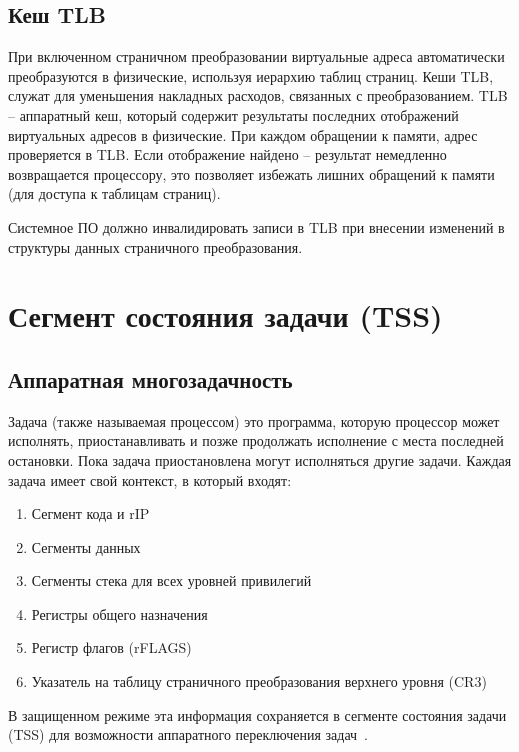 \subsection{Кеш TLB}
При включенном страничном преобразовании виртуальные адреса автоматически преобразуются в физические,
используя иерархию таблиц страниц. Кеши TLB, служат для уменьшения накладных расходов, связанных с преобразованием.
TLB -- аппаратный кеш, который содержит результаты последних отображений виртуальных адресов в физические.
При каждом обращении к памяти, адрес проверяется в TLB. Если отображение найдено -- результат немедленно возвращается
процессору, это позволяет избежать лишних обращений к памяти (для доступа к таблицам страниц).

Системное ПО должно инвалидировать записи в TLB при внесении изменений
в структуры данных страничного преобразования.



\section{Сегмент состояния задачи (TSS)}
\subsection{Аппаратная многозадачность}
Задача (также называемая процессом) это программа, которую процессор может
исполнять, приостанавливать и позже продолжать исполнение с места последней
остановки. Пока задача приостановлена могут исполняться другие задачи. Каждая
задача имеет свой контекст, в который входят:
\begin{enumerate}[1.]
\item Сегмент кода и rIP
\item Сегменты данных
\item Сегменты стека для всех уровней привилегий
\item Регистры общего назначения
\item Регистр флагов (rFLAGS)
\item Указатель на таблицу страничного преобразования верхнего уровня (CR3)
\end{enumerate}

В защищенном режиме эта информация сохраняется в сегменте состояния задачи (TSS)
для возможности аппаратного переключения задач~\cite[стр. 327]{amd_pm_v2}.

